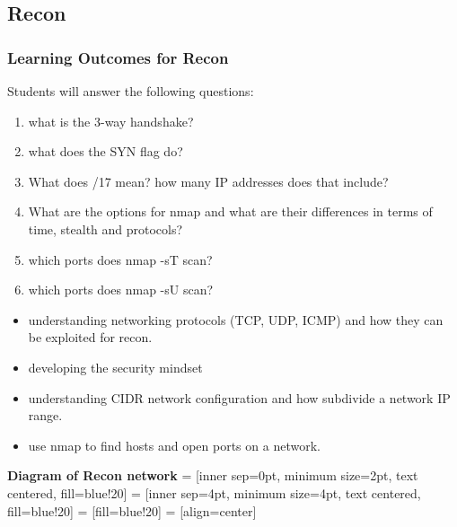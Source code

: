 \documentclass[11pt]{report}
\begin{document}
\subsection{Recon}
\subsubsection{Learning Outcomes for Recon}
Students will answer the following questions:
\begin{enumerate}
   \item what is the 3-way handshake?
   \item what does the SYN flag do?
   \item What does /17 mean?  how many IP addresses does that include?
   \item What are the options for nmap and what are their differences in terms of time, stealth and
   protocols?
   \item which ports does nmap -sT scan?
   \item which ports does nmap -sU scan?
\end{enumerate}

\begin{itemize}
\item understanding networking protocols (TCP, UDP, ICMP) and how they can be exploited for recon.
\item developing the security mindset
\item understanding CIDR network configuration and how subdivide a network IP range.
\item use nmap to find hosts and open ports on a network.
\end{itemize}

{\bf Diagram of Recon network}
\usetikzlibrary{arrows,decorations.pathmorphing,backgrounds,positioning,fit,petri}
 = [inner sep=0pt, minimum size=2pt, text centered, fill=blue!20]
 = [inner sep=4pt, minimum size=4pt, text centered, fill=blue!20]
 = [fill=blue!20]
 = [align=center]
\end{document}

